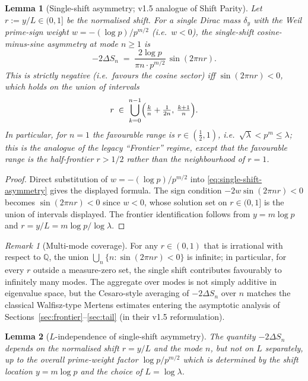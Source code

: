\documentclass[11pt,a4paper]{article}
\newtheorem{lemma}[lemma]{Lemma}
\theoremstyle{remark}
\newtheorem{remark}[remark]{Remark}
\theoremstyle{plain}
\begin{document}
\begin{lemma}[Single-shift asymmetry; v1.5 analogue of Shift Parity]
\label{lem:shift-parity-cvs}
Let $r:=y/L\in(0,1]$ be the normalised shift.  For a single Dirac mass
$\delta_y$ with the Weil prime-sign weight $w=-(\log p)/p^{m/2}$
(i.e.\ $w<0$), the single-shift cosine-minus-sine asymmetry at mode
$n\geq 1$ is
\[
  -2\Delta S_n \;=\; \frac{2\log p}{\pi n\cdot p^{m/2}}\,
  \sin(2\pi n r).
\]
This is \emph{strictly negative} (i.e.\ favours the cosine sector) iff
$\sin(2\pi n r)<0$, which holds on the union of intervals
\[
  r \;\in\; \bigcup_{k=0}^{n-1}\Bigl(\tfrac{k}{n}+\tfrac{1}{2n},\,
                                       \tfrac{k+1}{n}\Bigr).
\]
In particular, for $n=1$ the favourable range is
$r\in(\tfrac{1}{2},1)$, i.e.\ $\sqrt\lambda<p^m\le\lambda$; this is
the analogue of the legacy ``Frontier'' regime, except that the
favourable range is the half-frontier $r>1/2$ rather than the
neighbourhood of $r=1$.
\end{lemma}

\begin{proof}
Direct substitution of $w=-(\log p)/p^{m/2}$ into
\eqref{eq:single-shift-asymmetry} gives the displayed formula.  The
sign condition $-2w\sin(2\pi n r)<0$ becomes $\sin(2\pi nr)<0$ since
$w<0$, whose solution set on $r\in(0,1]$ is the union of intervals
displayed.  The frontier identification follows from
$y=m\log p$ and $r=y/L=m\log p/\log\lambda$.
\end{proof}

\begin{remark}[Multi-mode coverage]
\label{rem:multi-mode-coverage}
For any $r\in(0,1)$ that is irrational with respect to $\mathbb{Q}$,
the union $\bigcup_n\{n:\sin(2\pi n r)<0\}$ is infinite; in
particular, for every $r$ outside a measure-zero set, the single
shift contributes favourably to infinitely many modes.  The
aggregate over modes is not simply additive in eigenvalue space, but
the Cesaro-style averaging of $-2\Delta S_n$ over $n$ matches the
classical Walfisz-type Mertens estimates entering the asymptotic
analysis of Sections~\ref{sec:frontier}--\ref{sec:tail} (in their
v1.5 reformulation).
\end{remark}

\begin{lemma}[$L$-independence of single-shift asymmetry]
\label{lem:L-independence-cvs}
The quantity $-2\Delta S_n$ depends on the normalised shift $r=y/L$
and the mode $n$, but not on $L$ separately, up to the overall
prime-weight factor $\log p/p^{m/2}$ which is determined by the
shift location $y=m\log p$ and the choice of $L=\log\lambda$.
\end{lemma}
\end{document}

